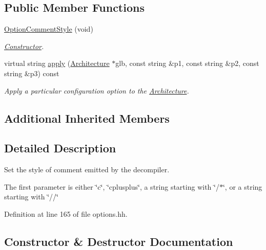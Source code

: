 \subsection*{Public Member Functions}
\begin{DoxyCompactItemize}
\item 
\mbox{\hyperlink{class_option_comment_style_a8ddb3a14e263a7ea850c36a16e39b350}{Option\+Comment\+Style}} (void)
\begin{DoxyCompactList}\small\item\em \mbox{\hyperlink{class_constructor}{Constructor}}. \end{DoxyCompactList}\item 
virtual string \mbox{\hyperlink{class_option_comment_style_a7371a6222646b1c3e16c3474c0c62b1b}{apply}} (\mbox{\hyperlink{class_architecture}{Architecture}} $\ast$glb, const string \&p1, const string \&p2, const string \&p3) const
\begin{DoxyCompactList}\small\item\em Apply a particular configuration option to the \mbox{\hyperlink{class_architecture}{Architecture}}. \end{DoxyCompactList}\end{DoxyCompactItemize}
\subsection*{Additional Inherited Members}


\subsection{Detailed Description}
Set the style of comment emitted by the decompiler. 

The first parameter is either \char`\"{}c\char`\"{}, \char`\"{}cplusplus\char`\"{}, a string starting with \char`\"{}/$\ast$\char`\"{}, or a string starting with \char`\"{}//\char`\"{} 

Definition at line 165 of file options.\+hh.



\subsection{Constructor \& Destructor Documentation}
\mbox{\label{class_option_comment_style_a8ddb3a14e263a7ea850c36a16e39b350}} 
